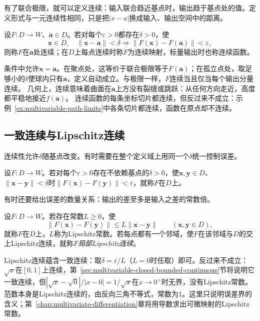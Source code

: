 有了联合极限，就可以定义连续：输入联合趋近基点时，输出趋于基点处的值。定义形式与一元连续性相同，只是把$|x-a|$换成输入、输出空间中的距离。
\begin{definition}[映射的连续性]
\label{def:multivariable-scalar-continuity}
设$F:D\to W$、$\bm a\in D$。若对每个$\varepsilon>0$都存在$\delta>0$，使
\[
 \bm x\in D,\quad\lVert\bm x-\bm a\rVert<\delta
 \Longrightarrow \lVert F(\bm x)-F(\bm a)\rVert<\varepsilon,
\]
则称$F$在$\bm a$处连续；在$D$上每点连续时称$F$为连续映射，标量输出时也称连续函数。
\end{definition}
条件中允许$\bm x=\bm a$。在聚点处，这等价于联合极限等于$F(\bm a)$；在孤立点处，取足够小的$\delta$使球内只有$\bm a$，定义自动成立。与极限一样，$F$连续当且仅当每个输出分量连续。
几何上，连续意味着曲面在$\bm a$上方没有裂缝或跳跃：从任何方向走近，高度都平稳地接近$f(\bm a)$。
连续函数的每条坐标切片都连续，但反过来不成立：示例~\ref{ex:multivariable-path-limits}中各条切片都连续，函数在原点却不连续。

\subsection{一致连续与Lipschitz连续}
\label{sec:multivariable-uniform-lipschitz}

连续性允许$\delta$随基点改变。有时需要在整个定义域上用同一个$\delta$统一控制误差。
\begin{definition}[一致连续]
\label{def:ls-uniform-continuity}
设$F:D\to W$。若对每个$\varepsilon>0$存在不依赖基点的$\delta>0$，使$\bm x,\bm y\in D$、$\lVert\bm x-\bm y\rVert<\delta$时$\lVert F(\bm x)-F(\bm y)\rVert<\varepsilon$，就称$F$在$D$上。
\end{definition}
有时还要给出误差的数量关系：输出的差至多是输入之差的常数倍。
\begin{definition}[Lipschitz连续]
\label{def:ls-lipschitz}
设$F:D\to W$。若存在常数$L\geq0$，使
\[
 \lVert F(\bm x)-F(\bm y)\rVert\leq L\lVert\bm x-\bm y\rVert\qquad(\bm x,\bm y\in D),
\]
就称$F$在$D$上，$L$称为Lipschitz常数。若每点都有一个邻域，使$F$在该邻域与$D$的交上Lipschitz连续，就称$F$\emph{局部Lipschitz连续}。
\end{definition}
Lipschitz连续蕴含一致连续：取$\delta=\varepsilon/L$（$L=0$时任取）即可。反过来不成立：$\sqrt x$在$[0,1]$上连续，第~\ref{sec:multivariable-closed-bounded-continuous}节将说明它一致连续，但$|\sqrt x-\sqrt0|/|x-0|=1/\sqrt x$在$x\to0^+$时无界，没有Lipschitz常数。范数本身是Lipschitz连续的，由反向三角不等式，常数为$1$。这里只说明误差界的含义；第~\ref{chap:multivariate-differentiation}章将用导数求出可微映射的Lipschitz常数。

